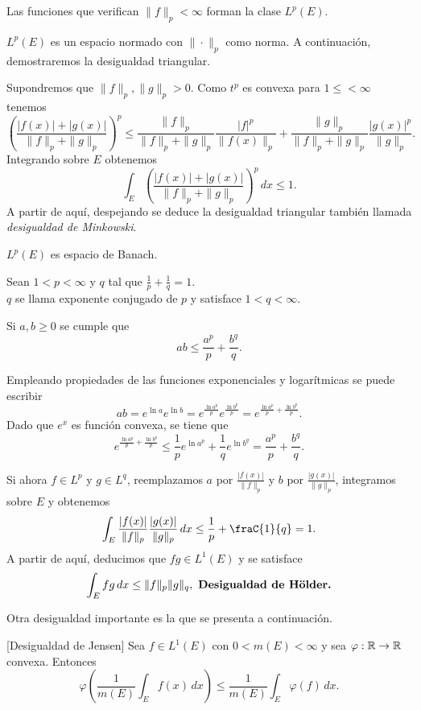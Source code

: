 Las funciones que verifican $\|f\|_p<\infty$ forman la clase $L^p(E)$.

$L^p(E)$ es un espacio normado con $\|\cdot \|_p$ como norma. A  continuaci\'on, demostraremos la desigualdad triangular. 

Supondremos que $\|f\|_p,\|g\|_p>0$. Como $t^p$ es convexa para $1\leq <\infty$ tenemos 
\[
\left( \frac{|f(x)|+|g(x)|}{\|f\|_p+\|g\|_p}   \right)^p \leq 
\frac{\|f\|_p}{\|f\|_p+\|g\|_p} \frac{|f|^p}{\|f(x)\|_p}+  
\frac{\|g\|_p}{\|f\|_p+\|g\|_p} \frac{|g(x)|^p}{\|g\|_p}.
\]
Integrando sobre $E$ obtenemos
\[
\int_E \left(\frac{|f(x)|+|g(x)|}{\|f\|_p+\|g\|_p}\right)^p \,dx\leq 1.
\]
A partir de aqu\'i, despejando se deduce la desigualdad triangular tambi\'en llamada \emph{desigualdad de Minkowski}.

\begin{ejercicio}{}
$L^p(E)$ es espacio de Banach.
\end{ejercicio}

Sean $1<p<\infty$ y $q$ tal que $\frac{1}{p}+\frac{1}{q}=1$. \\$q$ se llama exponente conjugado de $p$ y satisface  $1<q<\infty$.

\begin{lema}{}
 Si $a,b\geq 0$ se cumple que
\[ab\leq \frac{a^p}{p}+\frac{b^q}{q}.\]
\end{lema}

\begin{demo}
Empleando propiedades de las funciones exponenciales y logar\'itmicas se puede escribir
\[
ab=e^{\ln a} e^{\ln b}=e^{\frac{\ln a^p}{p}} e^{\frac{\ln b^p}{p}}=
e^{\frac{\ln a^p}{p}+\frac{\ln b^p}{p}}.
\]
Dado que $e^x$ es funci\'on convexa, se tiene que 
\[
e^{\frac{\ln a^p}{p}+\frac{\ln b^p}{p}}
\leq 
\frac{1}{p} e^{\ln a^p}+\frac{1}{q}e^{\ln b^q}=\frac{a^p}{p}+\frac{b^q}{q}.
\]
\end{demo}

Si ahora $f \in L^p$ y $g \in L^q$, reemplazamos $a$ por $\frac{|f(x)|}{\|f\|_p}$ y $b$ por $\frac{|g(x)|}{\|g\|_p}$,   
integramos sobre $E$ y obtenemos
\[
\int_E \frac{|f(x)|}{\|f\|_p} \frac{|g(x)|}{\|g\|_p} \,dx \leq \frac{1}{p}+\fraC{1}{q}=1.
\]
A partir de aqu\'i, deducimos que $fg\in L^1(E)$ y se satisface 
\[
\int_E fg \,dx \leq \|f\|_p \|g\|_q, \mbox{ \textbf{Desigualdad de H\"older.}}
\]

Otra desigualdad importante es la  que se presenta a continuaci\'on.

\begin{lema}{}[Desigualdad de Jensen]
 Sea $f \in L^1(E)$ con $0<m(E)<\infty$ y sea $\varphi:\mathbb{R} \to \mathbb{R}$ convexa. Entonces
 \[
 \varphi\left( \frac{1}{m(E)}\int_E f(x)\,dx \right) \leq \frac{1}{m(E)} \int_E \varphi(f)\,dx.
 \]
 \end{lema}

